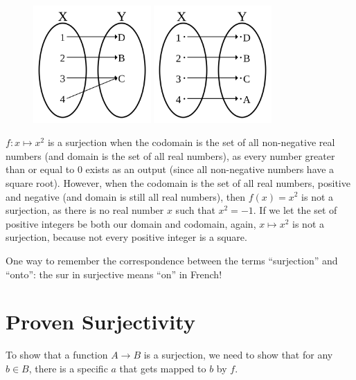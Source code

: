 \documentclass{article}
\begin{document}
\begin{figure}[h]
\centering
\includegraphics[width=0.4\textwidth]{./images/Surjection.png}
\includegraphics[width=0.4\textwidth]{./images/Bijection.png}
\label{fig:surjections}
\end{figure}

$f: x \mapsto x^2$ is a surjection when the codomain is the set of all non-negative real numbers (and domain is the set of all real numbers), as every number greater than or equal to $0$ exists as an output (since all non-negative numbers have a square root). However, when the codomain is the set of all real numbers, positive and negative (and domain is still all real numbers), then $f(x) = x^2$ is not a surjection, as there is no real number $x$ such that $x^2 = -1$. If we let the set of positive integers be both our domain and codomain, again, $x \mapsto x^2$ is not a surjection, because not every positive integer is a square.

One way to remember the correspondence between the terms “surjection” and “onto”: the sur in surjective means “on” in French!

\section{Proven Surjectivity}
To show that a function $A \rightarrow B$ is a surjection, we need to show that for any $b \in B$, there is a specific $a$ that gets mapped to $b$ by $f$.
\end{document}
